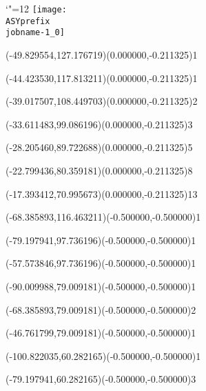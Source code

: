 \setlength{\unitlength}{1pt}%
\makeatletter%
\let\ASYencoding\f@encoding%
\let\ASYfamily\f@family%
\let\ASYseries\f@series%
\let\ASYshape\f@shape%
\makeatother%
{\catcode`"=12%
\texttt{[image: \\ASYprefix\\jobname-1\_0]}%
}%
%
%
\fontsize{9.000000}{10.800000}\selectfont%
\usefont{\ASYencoding}{\ASYfamily}{\ASYseries}{\ASYshape}%
\ASYalign(-49.829554,127.176719)(0.000000,-0.211325){1}%
%
%
\fontsize{9.000000}{10.800000}\selectfont%
\ASYalign(-44.423530,117.813211)(0.000000,-0.211325){1}%
%
%
\fontsize{9.000000}{10.800000}\selectfont%
\ASYalign(-39.017507,108.449703)(0.000000,-0.211325){2}%
%
%
\fontsize{9.000000}{10.800000}\selectfont%
\ASYalign(-33.611483,99.086196)(0.000000,-0.211325){3}%
%
%
\fontsize{9.000000}{10.800000}\selectfont%
\ASYalign(-28.205460,89.722688)(0.000000,-0.211325){5}%
%
%
\fontsize{9.000000}{10.800000}\selectfont%
\ASYalign(-22.799436,80.359181)(0.000000,-0.211325){8}%
%
%
\fontsize{9.000000}{10.800000}\selectfont%
\ASYalign(-17.393412,70.995673)(0.000000,-0.211325){13}%
%
%
\fontsize{9.000000}{10.800000}\selectfont%
\ASYalign(-68.385893,116.463211)(-0.500000,-0.500000){1}%
%
%
\fontsize{9.000000}{10.800000}\selectfont%
\ASYalign(-79.197941,97.736196)(-0.500000,-0.500000){1}%
%
%
\fontsize{9.000000}{10.800000}\selectfont%
\ASYalign(-57.573846,97.736196)(-0.500000,-0.500000){1}%
%
%
\fontsize{9.000000}{10.800000}\selectfont%
\ASYalign(-90.009988,79.009181)(-0.500000,-0.500000){1}%
%
%
\fontsize{9.000000}{10.800000}\selectfont%
\ASYalign(-68.385893,79.009181)(-0.500000,-0.500000){2}%
%
%
\fontsize{9.000000}{10.800000}\selectfont%
\ASYalign(-46.761799,79.009181)(-0.500000,-0.500000){1}%
%
%
\fontsize{9.000000}{10.800000}\selectfont%
\ASYalign(-100.822035,60.282165)(-0.500000,-0.500000){1}%
%
%
\fontsize{9.000000}{10.800000}\selectfont%
\ASYalign(-79.197941,60.282165)(-0.500000,-0.500000){3}%
%
%
\fontsize{9.000000}{10.800000}\selectfont%
